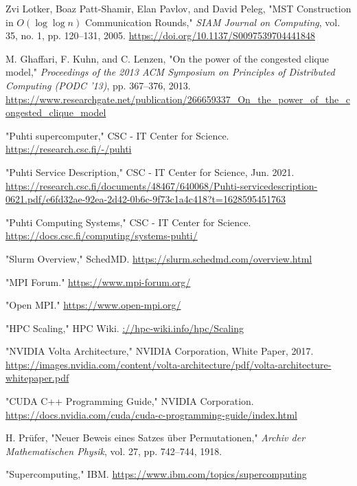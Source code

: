 \documentclass[english, 12pt, a4paper, elec, utf8, a-2b, online]{aaltothesis}
\begin{document}
\begin{thebibliography}{99}

	Zvi Lotker, Boaz Patt-Shamir, Elan Pavlov, and David Peleg, "MST Construction in $O(\log{\log{n}})$ Communication Rounds," 
	\textit{SIAM Journal on Computing}, vol. 35, no. 1, pp. 120–131, 2005. 
	\url{https://doi.org/10.1137/S0097539704441848}
	
	M. Ghaffari, F. Kuhn, and C. Lenzen, "On the power of the congested clique model," 
	\textit{Proceedings of the 2013 ACM Symposium on Principles of Distributed Computing (PODC '13)}, pp. 367–376, 2013. 
	\url{https://www.researchgate.net/publication/266659337_On_the_power_of_the_congested_clique_model}
	
	"Puhti supercomputer," CSC - IT Center for Science. 
	\url{https://research.csc.fi/-/puhti}
	
	"Puhti Service Description," CSC - IT Center for Science, Jun. 2021. 
	\url{https://research.csc.fi/documents/48467/640068/Puhti-servicedescription-0621.pdf/e6fd32ae-92ea-2d42-0b6c-9f73c1a4c418?t=1628595451763}
	
	"Puhti Computing Systems," CSC - IT Center for Science. 
	\url{https://docs.csc.fi/computing/systems-puhti/}
	
	"Slurm Overview," SchedMD. 
	\url{https://slurm.schedmd.com/overview.html}
	
	"MPI Forum." 
	\url{https://www.mpi-forum.org/}
	
	"Open MPI." 
	\url{https://www.open-mpi.org/}
	
	"HPC Scaling," HPC Wiki. 
	\url{://hpc-wiki.info/hpc/Scaling}
	
	"NVIDIA Volta Architecture," NVIDIA Corporation, White Paper, 2017. 
	\url{https://images.nvidia.com/content/volta-architecture/pdf/volta-architecture-whitepaper.pdf}
	
	"CUDA C++ Programming Guide," NVIDIA Corporation. 
	\url{https://docs.nvidia.com/cuda/cuda-c-programming-guide/index.html}
	
	H. Prüfer, "Neuer Beweis eines Satzes über Permutationen," 
	\textit{Archiv der Mathematischen Physik}, vol. 27, pp. 742–744, 1918.
	
	"Supercomputing," IBM. 
	\url{https://www.ibm.com/topics/supercomputing}
	

\end{thebibliography}
\end{document}
